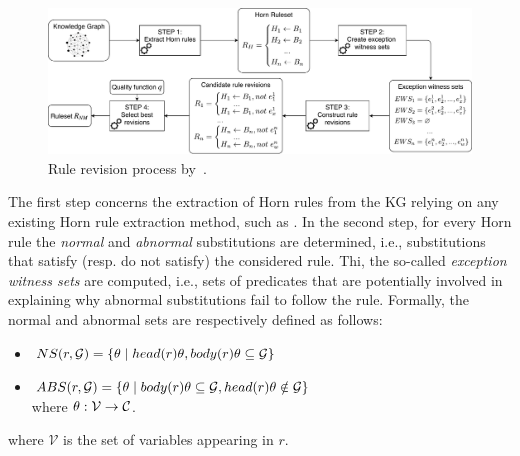 
\begin{figure}[t]
\centering
\includegraphics[width=1\textwidth]{figures/overview_new}
\caption{Rule revision process by~\cite{gad2016,rumis}.}
\label{fig:iswc_process}
\end{figure}

The first step concerns the extraction of Horn rules from the KG relying on any existing Horn rule extraction method, such as \cite{amie}.
 In the second step, for every Horn rule the \textit{normal} and \textit{abnormal} substitutions are determined, i.e., substitutions that satisfy (resp. do not satisfy) the considered rule. Thi, the so-called \emph{exception witness sets} are computed, i.e., sets of predicates that are potentially involved in explaining why abnormal substitutions fail to follow the rule. Formally, the normal and abnormal sets are respectively defined as follows:
\begin{itemize}
\item $NS(r, \mathcal{G}) = \{\theta \mid head(r)\theta, body(r)\theta \subseteq \mathcal{G}\}$
\item $ABS(r, \mathcal{G}) = \{\theta \mid body(r)\theta \subseteq \mathcal{G} , head(r)\theta \notin \mathcal{G}\}$\\
where $\theta: \mathcal{V} \rightarrow \mathcal{C}$.
\end{itemize}
where $\mathcal{V}$ is the set of variables appearing in $r$. 


